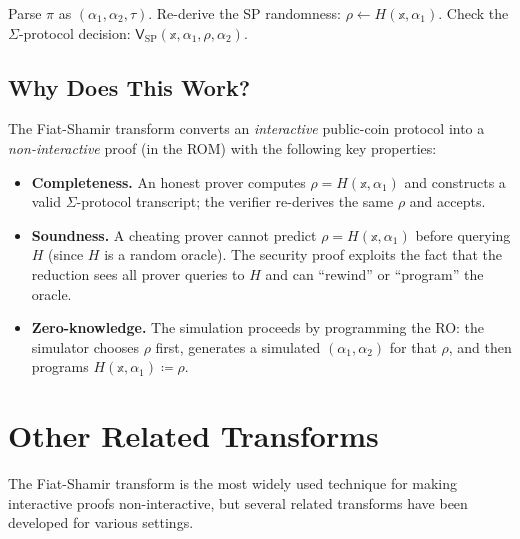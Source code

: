 \documentclass[11pt]{article}
\begin{document}
\begin{algorithm}[H]
\caption{Fiat-Shamir Verifier $\mathsf{V}^{H}(\mathbb{x},\pi)$}
\begin{algorithmic}[1]
  \State Parse $\pi$ as $(\alpha_1, \alpha_2, \tau)$.
  \State Re-derive the SP randomness:
         $\rho \leftarrow H(\mathbb{x}, \alpha_1)$.
  \State Check the $\Sigma$-protocol decision:
         \Return $\mathsf{V}_{\mathrm{SP}}(\mathbb{x}, \alpha_1, \rho, \alpha_2)$.
\end{algorithmic}
\end{algorithm}

\subsection{Why Does This Work?}

The Fiat-Shamir transform converts an \emph{interactive} public-coin
protocol into a \emph{non-interactive} proof (in the ROM) with the
following key properties:

\begin{itemize}
  \item \textbf{Completeness.}  An honest prover computes $\rho =
        H(\mathbb{x},\alpha_1)$ and constructs a valid $\Sigma$-protocol
        transcript; the verifier re-derives the same $\rho$ and accepts.
  \item \textbf{Soundness.}  A cheating prover cannot predict $\rho =
        H(\mathbb{x},\alpha_1)$ before querying $H$ (since $H$ is a
        random oracle).  The security proof exploits the fact that the
        reduction sees all prover queries to $H$ and can ``rewind'' or
        ``program'' the oracle.
  \item \textbf{Zero-knowledge.}  The simulation proceeds by programming
        the RO: the simulator chooses $\rho$ first, generates a simulated
        $(\alpha_1,\alpha_2)$ for that $\rho$, and then programs
        $H(\mathbb{x},\alpha_1) \coloneqq \rho$.
\end{itemize}

\section{Other Related Transforms}

The Fiat-Shamir transform is the most widely used technique for
making interactive proofs non-interactive, but several related
transforms have been developed for various settings.
\end{document}
